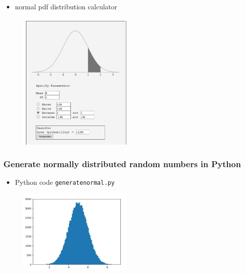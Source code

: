 \documentclass[english,14pt]{beamer}
\begin{document}

\begin{frame}[fragile]

\frametitle{}

\begin{itemize}
	\item normal pdf distribution calculator
\end{itemize}

\begin{figure}[ht]
	\centering
	\includegraphics[width=0.5\textwidth]{figures/normalprobcalculator}
\end{figure}

\end{frame}


\begin{frame}[fragile]

\frametitle{Generate normally distributed random numbers in Python}

\begin{itemize}
	\item Python code \texttt{generatenormal.py}
\end{itemize}

\begin{figure}[ht]
	\centering
	\includegraphics[width=0.5\textwidth]{figures/normalhist}
\end{figure}

\end{frame}
\end{document}
